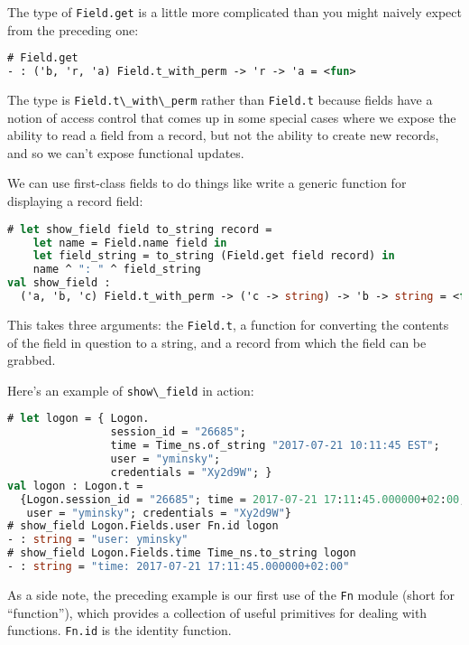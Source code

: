 The type of \passthrough{\lstinline!Field.get!} is a little more
complicated than you might naively expect from the preceding one:

\begin{lstlisting}[language=Caml]
# Field.get
- : ('b, 'r, 'a) Field.t_with_perm -> 'r -> 'a = <fun>
\end{lstlisting}

The type is \passthrough{\lstinline!Field.t\_with\_perm!} rather than
\passthrough{\lstinline!Field.t!} because fields have a notion of access
control that comes up in some special cases where we expose the ability
to read a field from a record, but not the ability to create new
records, and so we can't expose functional updates.

We can use first-class fields to do things like write a generic function
for displaying a record field:

\begin{lstlisting}[language=Caml]
# let show_field field to_string record =
    let name = Field.name field in
    let field_string = to_string (Field.get field record) in
    name ^ ": " ^ field_string
val show_field :
  ('a, 'b, 'c) Field.t_with_perm -> ('c -> string) -> 'b -> string = <fun>
\end{lstlisting}

This takes three arguments: the \passthrough{\lstinline!Field.t!}, a
function for converting the contents of the field in question to a
string, and a record from which the field can be grabbed.

Here's an example of \passthrough{\lstinline!show\_field!} in action:

\begin{lstlisting}[language=Caml]
# let logon = { Logon.
                session_id = "26685";
                time = Time_ns.of_string "2017-07-21 10:11:45 EST";
                user = "yminsky";
                credentials = "Xy2d9W"; }
val logon : Logon.t =
  {Logon.session_id = "26685"; time = 2017-07-21 17:11:45.000000+02:00;
   user = "yminsky"; credentials = "Xy2d9W"}
# show_field Logon.Fields.user Fn.id logon
- : string = "user: yminsky"
# show_field Logon.Fields.time Time_ns.to_string logon
- : string = "time: 2017-07-21 17:11:45.000000+02:00"
\end{lstlisting}

As a side note, the preceding example is our first use of the
\passthrough{\lstinline!Fn!} module (short for ``function''), which
provides a collection of useful primitives for dealing with functions.
\passthrough{\lstinline!Fn.id!} is the identity function.

